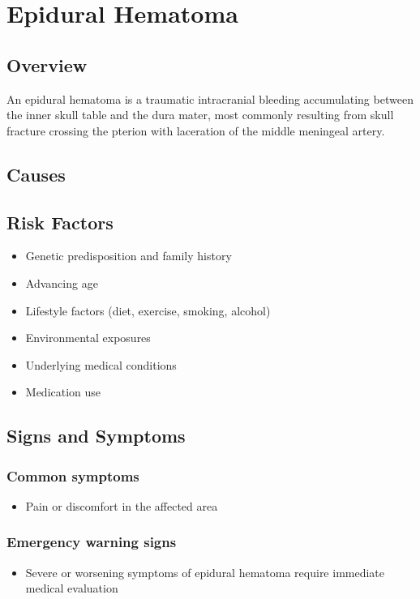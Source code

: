 \chapter{Epidural Hematoma}
\label{sec:Epidural Hematoma}

\section{Overview}
An epidural hematoma is a traumatic intracranial bleeding accumulating between the inner skull table and the dura mater, most commonly resulting from skull fracture crossing the pterion with laceration of the middle meningeal artery.
\section{Causes}
\section{Risk Factors}

\begin{itemize}[noitemsep]
  \item Genetic predisposition and family history
  \item Advancing age
  \item Lifestyle factors (diet, exercise, smoking, alcohol)
  \item Environmental exposures
  \item Underlying medical conditions
  \item Medication use
\end{itemize}
\section{Signs and Symptoms}

\subsection{Common symptoms}
\begin{itemize}[noitemsep]
  \item Pain or discomfort in the affected area
  \end{itemize}

\subsection{Emergency warning signs}
\begin{itemize}[noitemsep]
  \item Severe or worsening symptoms of epidural hematoma require immediate medical evaluation
\end{itemize}
